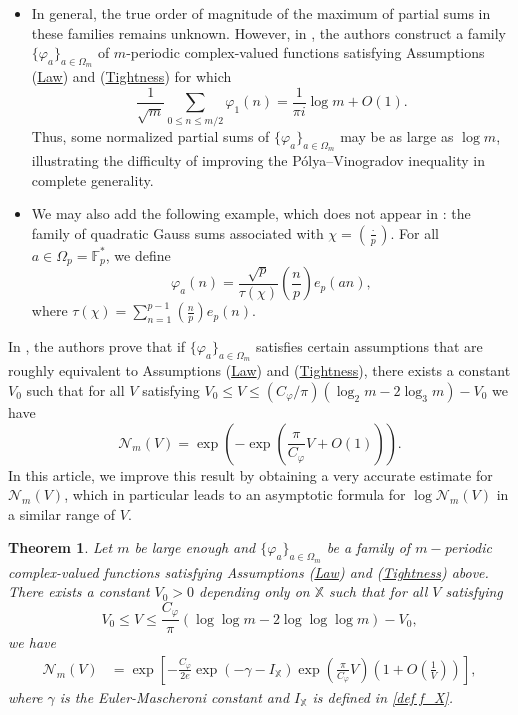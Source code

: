 \documentclass[12pt]{amsart}
\newtheorem{thm}{Theorem}[section]
\theoremstyle{definition}
\numberwithin{equation}{section}
\numberwithin{equation}{section}
\def\F{\mathbb{F}}
\def\Ncal{\mathcal{N}}
\def\Mp{C_\varphi}
\def\X{\mathbb{X}}
\begin{document}
\begin{itemize}
    \item In general, the true order of magnitude of the maximum of partial sums in these families remains unknown. However, in \cite{ABL21}, the authors construct a family $\{\varphi_a\}_{a\in\Omega_m}$ of $m$-periodic complex-valued functions satisfying Assumptions (\hyperlink{Ass Law}{Law}) and (\hyperlink{Ass Tightness}{Tightness}) for which
\[
\frac{1}{\sqrt{m}}\sum_{0\leq n\leq m/2}\varphi_1(n)
=
\frac{1}{\pi i}\log m + O(1).
\]
Thus, some normalized partial sums of
\(\{\varphi_a\}_{a\in\Omega_m}\) may be as large as \(\log m\), illustrating the difficulty of improving the Pólya–Vinogradov inequality in complete generality.

\item We may also add the following example, which does not appear in \cite{ABL21}: the family of quadratic Gauss sums associated with $\chi=\left(\frac{\cdot}{p}\right)$. For all $a\in \Omega_p= \F_p^*$, we define
    \[
    \varphi_a(n) =\frac{\sqrt{p}}{\tau(\chi)} \left(\frac{n}{p}\right)e_p(an),
    \]
    where $\tau(\chi) = \sum_{n=1}^{p-1} \left(\frac{n}{p}\right)e_p(n)$.
\end{itemize}


In \cite[Theorem 1.2]{ABL21}, the authors prove that if  $\{ \varphi_a\}_{a\in\Omega_m}$ satisfies certain assumptions that are roughly equivalent to Assumptions (\hyperlink{Ass Law}{Law}) and (\hyperlink{Ass Tightness}{Tightness}), there exists a constant $V_0$ such that for all \(V\) satisfying $V_0 \leq V \leq (\Mp/\pi )(\log_2 m- 2\log_3 m) -V_0$ we have
\[\Ncal_m(V)=
\exp\left(-\exp\left(\frac{\pi }{\Mp}V
+O(1)\right) \right). 
\]
In this article, we improve this result by obtaining a very accurate estimate for $\Ncal_m(V)$, which in particular leads to an asymptotic formula for $\log \Ncal_m(V)$ in a similar range of $V$. 


\begin{thm}\label{THM Ncal_m(V)} Let $m$ be large enough and $\{\varphi_a\}_{a\in\Omega_m}$ be a family of $m-$periodic complex-valued functions satisfying Assumptions (\hyperlink{Ass Law}{Law}) and (\hyperlink{Ass Tightness}{Tightness}) above. There exists a constant $ V_0>0$ depending only on $\X$ such that for all \(V\) satisfying
\[ V_0\leq V \leq \frac{\Mp}{\pi} \left(
\log\log m-2\log\log\log m\right)-V_0,\] 
we have 
\begin{align*}
\Ncal_m(V)
&=
\exp\left[- \frac{\Mp}{2 e} \exp\left(-\gamma-I_\X \right)\exp\left(\frac{\pi }{\Mp}V\right)
\left(1+O\left(\frac{1}{V}\right)\right) \right],
\end{align*}
where $\gamma$ is the Euler-Mascheroni constant and  $
I_\X $ is defined in \eqref{def f_X}.

\end{thm}
\end{document}
